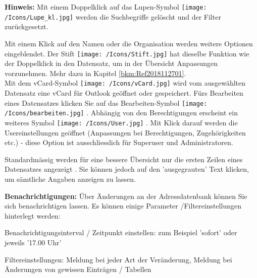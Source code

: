 \vspace{\baselineskip}

\textbf{Hinweis:} Mit einem Doppelklick auf das Lupen-Symbol \texttt{[image: /Icons/Lupe\_kl.jpg]}  werden die Suchbegriffe gelöscht und der Filter zurückgesetzt.

\vspace{\baselineskip}

Mit einem Klick auf den Namen  oder die Organisation werden weitere Optionen eingeblendet. Der Stift \texttt{[image: /Icons/Stift.jpg]}  hat dieselbe Funktion wie der Doppelklick in den Datensatz, um in der Übersicht Anpassungen vorzunehmen. Mehr dazu in Kapitel \ref{bkm:Ref2018112701}.\\
Mit dem vCard-Symbol \texttt{[image: /Icons/vCard.jpg]}  wird vom ausgewählten Datensatz eine vCard für Outlook geöffnet oder gespeichert. Fürs Bearbeiten eines Datensatzes klicken Sie auf das Bearbeiten-Symbol \texttt{[image: /Icons/bearbeiten.jpg]} . Abhängig von den Berechtigungen erscheint ein weiteres Symbol \texttt{[image: /Icons/User.jpg]} . Mit Klick darauf werden die Usereinstellungen geöffnet (Anpassungen bei Berechtigungen, Zugehörigkeiten etc.) - diese Option ist ausschliesslich für Superuser und Administratoren.

\vspace{\baselineskip}

Standardmässig werden für eine bessere Übersicht nur die ersten Zeilen eines Datensatzes angezeigt . Sie können jedoch auf den 'ausgegrauten' Text klicken, um sämtliche Angaben anzeigen zu lassen.

\vspace{\baselineskip}

\textbf{Benachrichtigungen:} Über Änderungen an der Adressdatenbank können Sie sich benachrichtigen lassen. Es können einige Parameter  /Filtereinstellungen hinterlegt werden:

\vspace{\baselineskip}

\begin{compactitem}
	\item Benachrichtigungsinterval / Zeitpunkt einstellen: zum Beispiel 'sofort' oder jeweils '17.00 Uhr'
	\item Filtereinstellungen: Meldung bei jeder Art der Veränderung, Meldung bei Änderungen von gewissen Einträgen / Tabellen
\end{compactitem}

